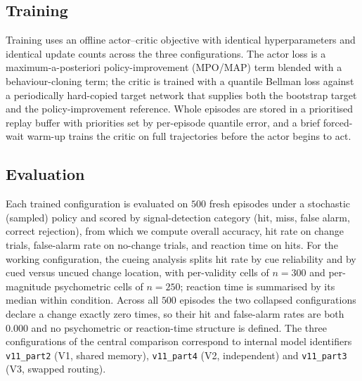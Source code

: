 \subsection{Training}
Training uses an offline actor--critic objective with identical hyperparameters and identical update counts across the three configurations. The actor loss is a maximum-a-posteriori policy-improvement (MPO/MAP) term blended with a behaviour-cloning term; the critic is trained with a quantile Bellman loss against a periodically hard-copied target network that supplies both the bootstrap target and the policy-improvement reference. Whole episodes are stored in a prioritised replay buffer with priorities set by per-episode quantile error, and a brief forced-wait warm-up trains the critic on full trajectories before the actor begins to act.

\subsection{Evaluation}
Each trained configuration is evaluated on $500$ fresh episodes under a stochastic (sampled) policy and scored by signal-detection category (hit, miss, false alarm, correct rejection), from which we compute overall accuracy, hit rate on change trials, false-alarm rate on no-change trials, and reaction time on hits. For the working configuration, the cueing analysis splits hit rate by cue reliability and by cued versus uncued change location, with per-validity cells of $n=300$ and per-magnitude psychometric cells of $n=250$; reaction time is summarised by its median within condition. Across all $500$ episodes the two collapsed configurations declare a change exactly zero times, so their hit and false-alarm rates are both $0.000$ and no psychometric or reaction-time structure is defined. The three configurations of the central comparison correspond to internal model identifiers \texttt{v11\_part2} (V1, shared memory), \texttt{v11\_part4} (V2, independent) and \texttt{v11\_part3} (V3, swapped routing).
